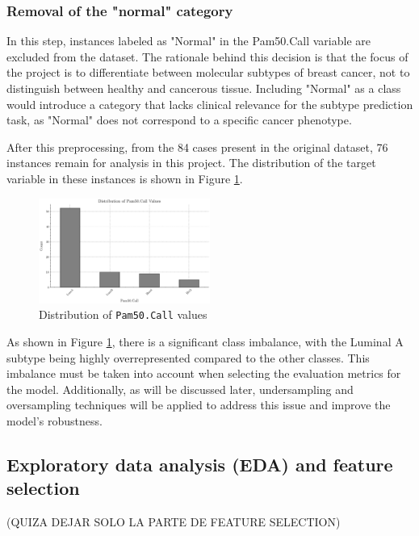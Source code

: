 \documentclass[conference]{IEEEtran}
\begin{document}
\subsubsection{Removal of the "normal" category}

In this step, instances labeled as "Normal" in the Pam50.Call variable are excluded from the dataset. The rationale behind this decision is that the focus of the project is to differentiate between molecular subtypes of breast cancer, not to distinguish between healthy and cancerous tissue. Including "Normal" as a class would introduce a category that lacks clinical relevance for the subtype prediction task, as "Normal" does not correspond to a specific cancer phenotype.

\vspace{5mm}

After this preprocessing, from the 84 cases present in the original dataset, 76 instances remain for analysis in this project. The distribution of the target variable in these instances is shown in Figure \ref{fig:pam_distr}.

\begin{figure}
    \centering
    \includegraphics[width=0.5\textwidth]{images/pam_distr.png}
    \caption{Distribution of \texttt{Pam50.Call} values}
    \label{fig:pam_distr}
\end{figure}

As shown in Figure \ref{fig:pam_distr}, there is a significant class imbalance, with the Luminal A subtype being highly overrepresented compared to the other classes. This imbalance must be taken into account when selecting the evaluation metrics for the model. Additionally, as will be discussed later, undersampling and oversampling techniques will be applied to address this issue and improve the model’s robustness.

\subsection{Exploratory data analysis (EDA) and feature selection} (QUIZA DEJAR SOLO LA PARTE DE FEATURE SELECTION)
\end{document}

